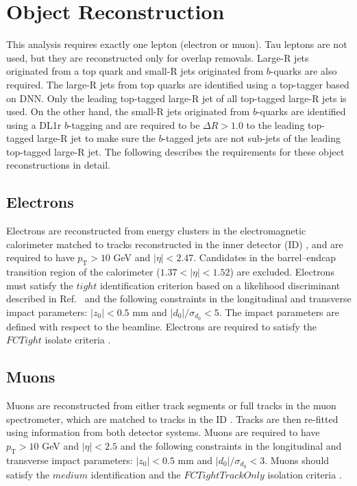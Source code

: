 \section{Object Reconstruction}
\label{sec:ObjectReco}

This analysis requires exactly one lepton (electron or muon). Tau leptons are not used, but they are reconstructed only for overlap removals. Large-R jets originated from a top quark and small-R jets originated from $b$-quarks are also required. The large-R jets from top quarks are identified using a top-tagger based on DNN. Only the leading top-tagged large-R jet of all top-tagged large-R jets is used. On the other hand, the small-R jets originated from $b$-quarks are identified using a DL1r $b$-tagging and are required to be ${\Delta}R>1.0$ to the leading top-tagged large-R jet to make sure the $b$-tagged jets are not sub-jets of the leading top-tagged large-R jet. The following describes the requirements for these object reconstructions in detail.

\subsection{Electrons}
\label{subsec:Electrons}
Electrons are reconstructed from energy clusters in the electromagnetic calorimeter matched to tracks reconstructed in the inner detector (ID) \cite{PERF-2013-03,ATLAS-CONF-2016-024}, and are required to have $p_\text{T}>10$ GeV and $|\eta|<2.47$. Candidates in the barrel--endcap transition region of the calorimeter ($1.37<|\eta|<1.52$) are excluded. Electrons must satisfy the $tight$ identification criterion based on a likelihood discriminant described in Ref.~\cite{ATLAS-CONF-2016-024} and the following constraints in the longitudinal and transverse impact parameters: $|z_{0}|<0.5$ mm and $|d_{0}|/\sigma_{d_{0}}<5$. The impact parameters are defined with respect to the beamline. Electrons are required to satisfy the $FCTight$ isolate criteria \cite{IsolationSelectionTool}.

\subsection{Muons}
\label{subsec:Muons}
Muons are reconstructed from either track segments or full tracks in the muon spectrometer, which are matched to tracks in the ID \cite{PERF-2015-10}. Tracks are then re-fitted using information from both detector systems. Muons are required to have $p_\text{T}>10$ GeV and $|\eta|<2.5$ and the following constraints in the longitudinal and transverse impact parameters: $|z_{0}|<0.5$ mm and $|d_{0}|/\sigma_{d_{0}}<3$. Muons should satisfy the $medium$ identification and the $FCTightTrackOnly$ isolation criteria \cite{IsolationSelectionTool}.
